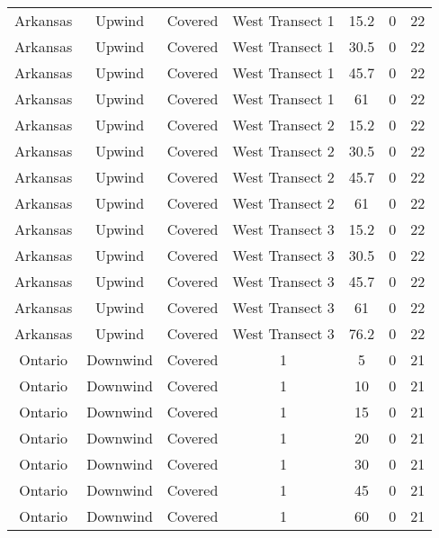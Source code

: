 \documentclass{article}
\begin{document}
\begin{longtable}[c]{ccccccc}
Arkansas  & Upwind    & Covered     & West Transect 1 & 15.2         & 0           & 22  \\
Arkansas  & Upwind    & Covered     & West Transect 1 & 30.5         & 0           & 22  \\
Arkansas  & Upwind    & Covered     & West Transect 1 & 45.7         & 0           & 22  \\
Arkansas  & Upwind    & Covered     & West Transect 1 & 61           & 0           & 22  \\
Arkansas  & Upwind    & Covered     & West Transect 2 & 15.2         & 0           & 22  \\
Arkansas  & Upwind    & Covered     & West Transect 2 & 30.5         & 0           & 22  \\
Arkansas  & Upwind    & Covered     & West Transect 2 & 45.7         & 0           & 22  \\
Arkansas  & Upwind    & Covered     & West Transect 2 & 61           & 0           & 22  \\
Arkansas  & Upwind    & Covered     & West Transect 3 & 15.2         & 0           & 22  \\
Arkansas  & Upwind    & Covered     & West Transect 3 & 30.5         & 0           & 22  \\
Arkansas  & Upwind    & Covered     & West Transect 3 & 45.7         & 0           & 22  \\
Arkansas  & Upwind    & Covered     & West Transect 3 & 61           & 0           & 22  \\
Arkansas  & Upwind    & Covered     & West Transect 3 & 76.2         & 0           & 22  \\
Ontario   & Downwind  & Covered     & 1               & 5            & 0           & 21  \\
Ontario   & Downwind  & Covered     & 1               & 10           & 0           & 21  \\
Ontario   & Downwind  & Covered     & 1               & 15           & 0           & 21  \\
Ontario   & Downwind  & Covered     & 1               & 20           & 0           & 21  \\
Ontario   & Downwind  & Covered     & 1               & 30           & 0           & 21  \\
Ontario   & Downwind  & Covered     & 1               & 45           & 0           & 21  \\
Ontario   & Downwind  & Covered     & 1               & 60           & 0           & 21  \\

\end{longtable}
\end{document}
